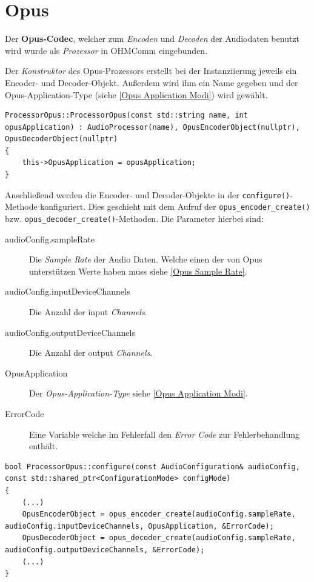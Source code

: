 \section{Opus}

Der \textbf{Opus-Codec}, welcher zum \textit{Encoden} und \textit{Decoden} der Audiodaten benutzt wird wurde als \textit{Prozessor} in OHMComm eingebunden.

Der \textit{Konstruktor} des Opus-Prozessors erstellt bei der Instanziierung jeweils ein Encoder- und Decoder-Objekt. Außerdem wird ihm ein Name gegeben und der Opus-Application-Type (siehe \ref{Opus Application Modi}) wird gewählt.

\begin{lstlisting}[caption={Instanziierung des Opus Prozessors},label={Code:Opus Instanziierung}]
ProcessorOpus::ProcessorOpus(const std::string name, int opusApplication) : AudioProcessor(name), OpusEncoderObject(nullptr), OpusDecoderObject(nullptr)
{
    this->OpusApplication = opusApplication;
}
\end{lstlisting}

Anschließend werden die Encoder- und Decoder-Objekte in der \texttt{configure()}-Methode konfiguriert. Dies geschieht mit dem Aufruf der \texttt{opus\_encoder\_create()} bzw. \texttt{opus\_decoder\_create()}-Methoden. Die Parameter hierbei sind:
\begin{description}
\item[audioConfig.sampleRate] Die \textit{Sample Rate} der Audio Daten. Welche einen der von Opus unterstützen Werte haben muss siehe \ref{Opus Sample Rate}.
\item[audioConfig.inputDeviceChannels] Die Anzahl der input \textit{Channels}.
\item[audioConfig.outputDeviceChannels] Die Anzahl der output \textit{Channels}.
\item[OpusApplication] Der \textit{Opus-Application-Type} siehe \ref{Opus Application Modi}.
\item[ErrorCode] Eine Variable welche im Fehlerfall den \textit{Error Code} zur Fehlerbehandlung enthält.
\end{description}

\begin{lstlisting}[caption={Konfiguration der Opus Encoder und Decoder-Objekte},label={Code:Opus Konfiguration}]
bool ProcessorOpus::configure(const AudioConfiguration& audioConfig, const std::shared_ptr<ConfigurationMode> configMode)
{
	(...)
	OpusEncoderObject = opus_encoder_create(audioConfig.sampleRate, audioConfig.inputDeviceChannels, OpusApplication, &ErrorCode);
	OpusDecoderObject = opus_decoder_create(audioConfig.sampleRate, audioConfig.outputDeviceChannels, &ErrorCode);
	(...)
}
\end{lstlisting}

